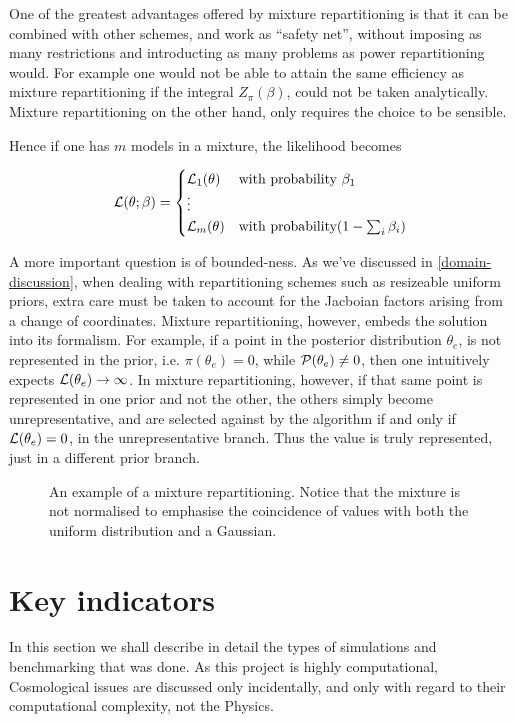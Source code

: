 \documentclass[usenatbib]{mnras}
\begin{document}
One of the greatest advantages offered by mixture repartitioning
is that it can be combined with other schemes, and work as
``safety net'', without imposing as many restrictions and
introducting as many problems as power repartitioning would. For
example one would not be able to attain the same efficiency as
mixture repartitioning if the integral \(Z_{\pi}(\beta)\), could not
be taken analytically. Mixture repartitioning on the other hand,
only requires the choice to be sensible.

Hence if one has \(m\) models in a mixture, the likelihood becomes 

\begin{equation}
  {\cal L}(\theta; \beta)  = \begin{cases}
	{\cal L}_{1}(\theta) & \text{with probability } \beta_{1}\\
    \vdots\\
	{\cal L}_{m}(\theta) & \text{with probability} (1- \sum_{i}\beta_{i})
	\end{cases}
\end{equation}


A more important question is of bounded-ness. As we've discussed in
\autoref{domain-discussion}, when dealing with repartitioning
schemes such as resizeable uniform priors, extra care must be
taken to account for the Jacboian factors arising from a change of
coordinates. Mixture repartitioning, however, embeds the solution
into its formalism. For example, if a point in the posterior
distribution \(\theta_{e}\), is not represented in the prior, i.e.
\(\pi(\theta_{e}) = 0\), while \({\cal P}(\theta_{e}) \ne 0\), then
one intuitively expects \({\cal L}(\theta_{e}) \rightarrow
	\infty\). In mixture repartitioning, however, if that same point is
represented in one prior and not the other, the others simply
become unrepresentative, and are selected against by the algorithm
if and only if \({\cal L}(\theta_{e}) = 0\), in the unrepresentative
branch. Thus the value is truly represented, just in a different
prior branch.

\begin{figure}
 
\caption{\label{orge90218c}
An example of a mixture repartitioning. Notice that the mixture is not normalised to emphasise the coincidence of values with both the uniform distribution and a Gaussian.}
\end{figure}



\section{Key indicators}
\label{sec:org7c8edc2}
In this section we shall describe in detail the types of simulations
and benchmarking that was done. As this project is highly
computational, Cosmological issues are discussed only incidentally,
and only with regard to their computational complexity, not the
Physics.
\end{document}
